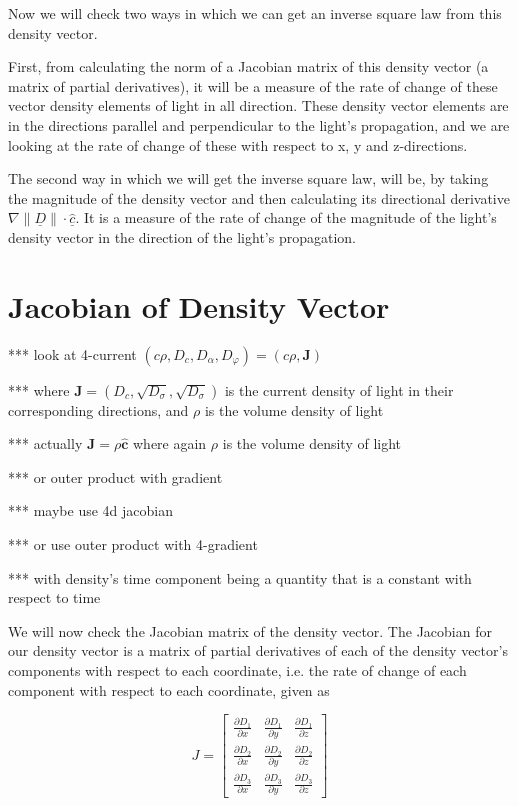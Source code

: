 Now we will check two ways in which we can get an inverse square law from this density vector.

First, from calculating the norm of a Jacobian matrix of this density vector (a matrix of partial derivatives), it will be a measure of the rate of change of these vector density elements of light in all direction.
These density vector elements are in the directions parallel and perpendicular to the light's propagation, and we are looking at the rate of change of these with respect to x, y and z-directions.

The second way in which we will get the inverse square law, will be, by taking the magnitude of the density vector and then calculating its directional derivative $ \nabla  \| \underline{D} \| \cdot \hat{\underline{c}}$.
It is a measure of the rate of change of the magnitude of the light's density vector in the direction of the light's propagation.

\section{Jacobian of Density Vector}\label{sect: Jacobian matrix of the Density vec}

*** look at 4-current $(c\rho, D_c, D_\alpha, D_\varphi)= (c\rho, \mathbf{J})$

*** where $\mathbf{J}=(D_c,\sqrt{D_\sigma},\sqrt{D_\sigma})$ is the current density of light in their corresponding directions, and $\rho$ is the volume density of light

*** actually $\mathbf{J}= \rho \mathbf{\hat{c}}$ where again $\rho$ is the volume density of light

*** or outer product with gradient

*** maybe use 4d jacobian

*** or use outer product with 4-gradient

*** with density's time component being a quantity that is a constant with respect to time

We will now check the Jacobian matrix of the density vector.
The Jacobian for our density vector is a matrix of partial derivatives of each of the density vector's components with respect to each coordinate, i.e. the rate of change of each component with respect to each coordinate, given as

\begin{equation}
	J = \begin{bmatrix}
		\frac{\partial D_{1}}{\partial x} & \frac{\partial D_{1}}{\partial y} & \frac{\partial D_{1}}{\partial z} \\
		\frac{\partial D_{2}}{\partial x} & \frac{\partial D_{2}}{\partial y} & \frac{\partial D_{2}}{\partial z} \\
		\frac{\partial D_{3}}{\partial x} & \frac{\partial D_{3}}{\partial y} & \frac{\partial D_{3}}{\partial z}
	\end{bmatrix}
\end{equation}

